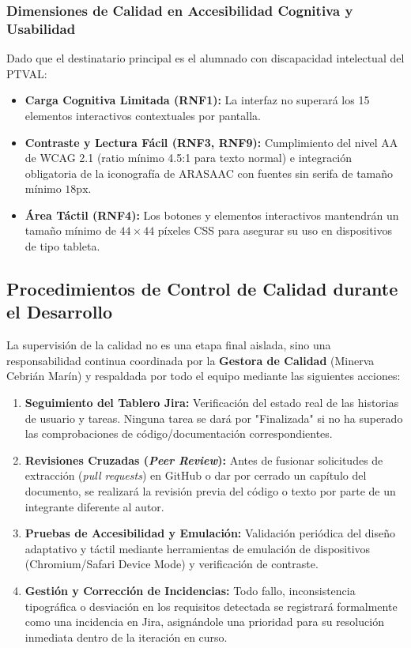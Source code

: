 \subsubsection{Dimensiones de Calidad en Accesibilidad Cognitiva y Usabilidad}
Dado que el destinatario principal es el alumnado con discapacidad intelectual del PTVAL:
\begin{itemize}
    \item \textbf{Carga Cognitiva Limitada (\textsf{RNF1}):} La interfaz no superará los 15 elementos interactivos contextuales por pantalla.
    \item \textbf{Contraste y Lectura Fácil (\textsf{RNF3}, \textsf{RNF9}):} Cumplimiento del nivel AA de WCAG 2.1 (ratio mínimo 4.5:1 para texto normal) e integración obligatoria de la iconografía de ARASAAC con fuentes sin serifa de tamaño mínimo $18\text{px}$.
    \item \textbf{Área Táctil (\textsf{RNF4}):} Los botones y elementos interactivos mantendrán un tamaño mínimo de $44\times44$ píxeles CSS para asegurar su uso en dispositivos de tipo tableta.
\end{itemize}

\subsection{Procedimientos de Control de Calidad durante el Desarrollo}

La supervisión de la calidad no es una etapa final aislada, sino una responsabilidad continua coordinada por la \textbf{Gestora de Calidad} (Minerva Cebrián Marín) y respaldada por todo el equipo mediante las siguientes acciones:

\begin{enumerate}
    \item \textbf{Seguimiento del Tablero Jira:} Verificación del estado real de las historias de usuario y tareas. Ninguna tarea se dará por "Finalizada" si no ha superado las comprobaciones de código/documentación correspondientes.
    \item \textbf{Revisiones Cruzadas (\textit{Peer Review}):} Antes de fusionar solicitudes de extracción (\textit{pull requests}) en GitHub o dar por cerrado un capítulo del documento, se realizará la revisión previa del código o texto por parte de un integrante diferente al autor.
    \item \textbf{Pruebas de Accesibilidad y Emulación:} Validación periódica del diseño adaptativo y táctil mediante herramientas de emulación de dispositivos (Chromium/Safari Device Mode) y verificación de contraste.
    \item \textbf{Gestión y Corrección de Incidencias:} Todo fallo, inconsistencia tipográfica o desviación en los requisitos detectada se registrará formalmente como una incidencia en Jira, asignándole una prioridad para su resolución inmediata dentro de la iteración en curso.
\end{enumerate}

